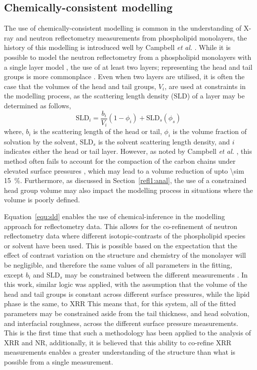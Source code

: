 \subsection{Chemically-consistent modelling}
The use of chemically-consistent modelling is common in the understanding of X-ray and neutron reflectometry measurements from phospholipid monolayers, the history of this modelling is introduced well by Campbell \emph{et al.} \cite{campbell_structure_2018}.
While it is possible to model the neutron reflectometry from a phospholipid monolayers with a single layer model \cite{wojciechowski_interaction_2016,wojciechowski_complexation_2016}, the use of at least two layers; representing the head and tail groups is more commonplace \cite{foglia_interaction_2014,bello_influence_2016}.
Even when two layers are utilised, it is often the case that the volumes of the head and tail groups, $V_i$, are used at constraints in the modelling process, as the scattering length density ($\text{SLD}$) of a layer may be determined as follows,
%
\begin{equation}
\text{SLD}_i = \frac{b_i}{V_i}(1-\phi_i)+\text{SLD}_s(\phi_s)
\label{equ:sld}
\end{equation}
%
where, $b_i$ is the scattering length of the head or tail, $\phi_i$ is the volume fraction of solvation by the solvent, $\text{SLD}_s$ is the solvent scattering length density, and $i$ indicates either the head or tail layer.
However, as noted by Campbell \emph{et al.} \cite{campbell_structure_2018}, this method often fails to account for the compaction of the carbon chains under elevated surface pressures \cite{mcconlogue_close_1997,small_lateral_1984}, which may lead to a volume reduction of upto \SI{\sim 15}{\percent}.
Furthermore, as discussed in Section~\ref{refl1:anal}, the use of a constrained head group volume may also impact the modelling process in situations where the volume is poorly defined.

Equation~\ref{equ:sld} enables the use of chemical-inference in the modelling approach for reflectometry data.
This allows for the co-refinement of neutron reflectometry data where different isotopic-contrasts of the phospholipid species or solvent have been used.
This is possible based on the expectation that the effect of contrast variation on the structure and chemistry of the monolayer will be negligible, and therefore the same values of all parameters in the fitting, except $b_i$ and $\text{SLD}_s$ may be constrained between the different measurements \cite{hollinshead_effects_2009}.
In this work, similar logic was applied, with the assumption that the volume of the head and tail groups is constant across different surface pressures, while the lipid phase is the same, to XRR
This means that, for this system, all of the fitted parameters may be constrained aside from the tail thickness, and head solvation, and interfacial roughness, across the different surface pressure measurements.
This is the first time that such a methodology has been applied to the analysis of XRR and NR, additionally, it is believed that this ability to co-refine XRR measurements enables a greater understanding of the structure than what is possible from a single measurement.
